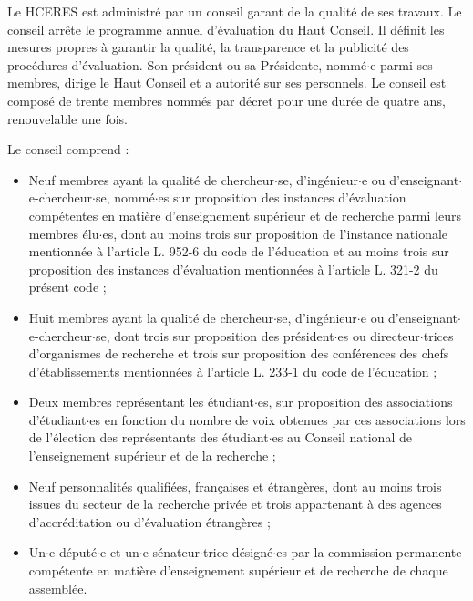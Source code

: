 \bigskip

Le HCERES est administr\'e par un conseil garant de la qualit\'e de ses travaux. Le conseil arr\^ete le programme annuel d'\'evaluation du Haut Conseil. Il d\'efinit les mesures propres \`a garantir la qualit\'e, la transparence et la publicit\'e des proc\'edures d'\'evaluation. Son pr\'esident ou sa Pr\'esidente, nomm\'e$\cdot$e parmi ses membres, dirige le Haut Conseil et a autorit\'e sur ses personnels. Le conseil est compos\'e de trente membres nomm\'es par d\'ecret pour une dur\'ee de quatre ans, renouvelable une fois.

Le conseil comprend :
\begin{itemize}
\item Neuf membres ayant la qualit\'e de chercheur$\cdot$se, d'ing\'enieur$\cdot$e ou d'enseignant$\cdot$e-chercheur$\cdot$se, nomm\'e$\cdot$es sur proposition des instances d'\'evaluation comp\'etentes en mati\`ere d'enseignement sup\'erieur et de recherche parmi leurs membres \'elu$\cdot$es, dont au moins trois sur proposition de l'instance nationale mentionn\'ee 
\`a l'article L. 952-6 du code de l'\'education et au moins trois sur proposition des instances d'\'evaluation mentionn\'ees \`a l'article L. 321-2 du pr\'esent code ;
\item Huit membres ayant la qualit\'e de chercheur$\cdot$se, d'ing\'enieur$\cdot$e ou d'enseignant$\cdot$e-chercheur$\cdot$se, dont trois sur proposition des pr\'esident$\cdot$es ou directeur$\cdot$trices d'organismes de recherche et trois sur proposition des conf\'erences des chefs d'\'etablissements mentionn\'ees \`a l'article L. 233-1 du code de l'\'education ;
\item Deux membres repr\'esentant les \'etudiant$\cdot$es, sur proposition des associations d'\'etudiant$\cdot$es en fonction du nombre de voix obtenues par ces associations lors de l'\'election des repr\'esentants des \'etudiant$\cdot$es au Conseil national de l'enseignement sup\'erieur et de la recherche ;
\item Neuf personnalit\'es qualifi\'ees, fran\c caises et \'etrang\`eres, dont au moins trois issues du secteur de la recherche priv\'ee et trois appartenant \`a des agences d'accr\'editation ou d'\'evaluation \'etrang\`eres ;
\item Un$\cdot$e d\'eput\'e$\cdot$e et un$\cdot$e s\'enateur$\cdot$trice d\'esign\'e$\cdot$es par la commission permanente comp\'etente en mati\`ere d'enseignement sup\'erieur et de recherche de chaque assembl\'ee.
\end{itemize}
 


